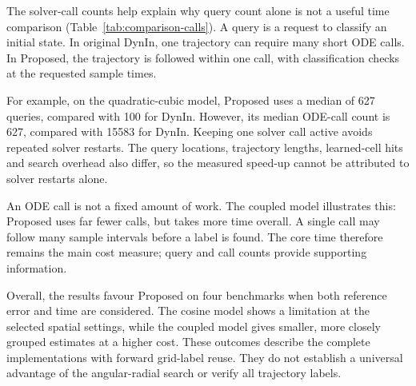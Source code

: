

The solver-call counts help explain why query count alone is not a useful time comparison (Table~\ref{tab:comparison-calls}). A query is a request to classify an initial state. In original DynIn, one trajectory can require many short ODE calls. In Proposed, the trajectory is followed within one call, with classification checks at the requested sample times.

For example, on the quadratic-cubic model, Proposed uses a median of 627 queries, compared with 100 for DynIn. However, its median ODE-call count is 627, compared with 15583 for DynIn. Keeping one solver call active avoids repeated solver restarts. The query locations, trajectory lengths, learned-cell hits and search overhead also differ, so the measured speed-up cannot be attributed to solver restarts alone.

An ODE call is not a fixed amount of work. The coupled model illustrates this: Proposed uses far fewer calls, but takes more time overall. A single call may follow many sample intervals before a label is found. The core time therefore remains the main cost measure; query and call counts provide supporting information.

Overall, the results favour Proposed on four benchmarks when both reference error and time are considered. The cosine model shows a limitation at the selected spatial settings, while the coupled model gives smaller, more closely grouped estimates at a higher cost. These outcomes describe the complete implementations with forward grid-label reuse. They do not establish a universal advantage of the angular-radial search or verify all trajectory labels.
